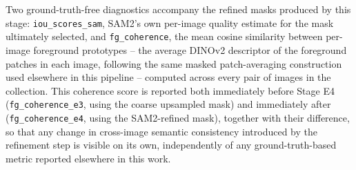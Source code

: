 Two ground-truth-free diagnostics accompany the refined masks produced by this stage: \texttt{iou\_scores\_sam}, SAM2's own per-image quality estimate for the mask ultimately selected, and \texttt{fg\_coherence}, the mean cosine similarity between per-image foreground prototypes -- the average DINOv2 descriptor of the foreground patches in each image, following the same masked patch-averaging construction used elsewhere in this pipeline -- computed across every pair of images in the collection. This coherence score is reported both immediately before Stage E4 (\texttt{fg\_coherence\_e3}, using the coarse upsampled mask) and immediately after (\texttt{fg\_coherence\_e4}, using the SAM2-refined mask), together with their difference, so that any change in cross-image semantic consistency introduced by the refinement step is visible on its own, independently of any ground-truth-based metric reported elsewhere in this work. 
